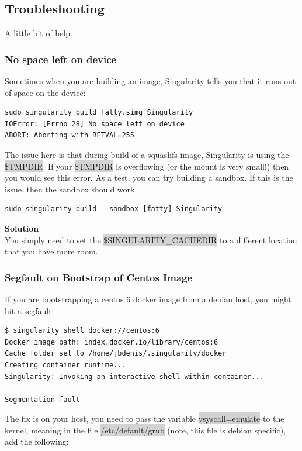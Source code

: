 \documentclass[a4paper]{article}
\begin{document}
\subsection{Troubleshooting} 
A little bit of help.

\subsubsection{No space left on device}

Sometimes when you are building an image, Singularity tells you that it runs out of space on the device:\\[0.1in]

\begin{lstlisting}[frame=single]
sudo singularity build fatty.simg Singularity
IOError: [Errno 28] No space left on device
ABORT: Aborting with RETVAL=255
\end{lstlisting}

The issue here is that during build of a squashfs image, Singularity is using the \colorbox{lightgray}{\$TMPDIR}. If your \colorbox{lightgray}{\$TMPDIR} is overflowing (or the mount is very small!) then you would see this error. As a test, you can try building a sandbox. If this is the issue, then the sandbox should work.

\begin{lstlisting}[frame=single]
sudo singularity build --sandbox [fatty] Singularity

\end{lstlisting}

\textbf{Solution}\\

You simply need to set the \colorbox{lightgray}{\$SINGULARITY\_CACHEDIR} to a different location that you have more room.

\subsubsection{Segfault on Bootstrap of Centos Image}
If you are bootstrapping a centos 6 docker image from a debian host, you might hit a segfault:\\[0.1in]

\begin{lstlisting}[frame=single]
$ singularity shell docker://centos:6 
Docker image path: index.docker.io/library/centos:6
Cache folder set to /home/jbdenis/.singularity/docker
Creating container runtime...
Singularity: Invoking an interactive shell within container...

Segmentation fault
\end{lstlisting}
The fix is on your host, you need to pass the variable \colorbox{lightgray}{vsyscall=emulate} to the kernel, meaning in the file \colorbox{lightgray}{/etc/default/grub} (note, this file is debian specific), add the following:
\end{document}
